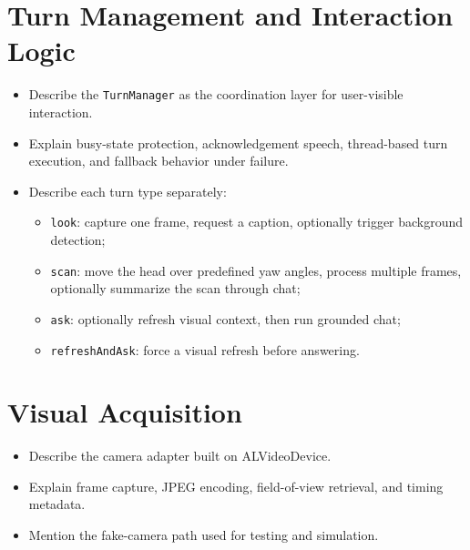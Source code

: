 \documentclass[
  digital,     %
  oneside,     %
  nosansbold,  %
  nocolorbold, %
  lof,         %
  lot,         %
]{fithesis4}
\begin{document}
\section{Turn Management and Interaction Logic}
\begin{itemize}
    \item Describe the \texttt{TurnManager} as the coordination layer for user-visible interaction.
    \item Explain busy-state protection, acknowledgement speech, thread-based turn execution, and fallback behavior under failure.
    \item Describe each turn type separately:
    \begin{itemize}
        \item \texttt{look}: capture one frame, request a caption, optionally trigger background detection;
        \item \texttt{scan}: move the head over predefined yaw angles, process multiple frames, optionally summarize the scan through chat;
        \item \texttt{ask}: optionally refresh visual context, then run grounded chat;
        \item \texttt{refreshAndAsk}: force a visual refresh before answering.
    \end{itemize}
\end{itemize}

\section{Visual Acquisition}
\begin{itemize}
    \item Describe the camera adapter built on ALVideoDevice.
    \item Explain frame capture, JPEG encoding, field-of-view retrieval, and timing metadata.
    \item Mention the fake-camera path used for testing and simulation.
\end{itemize}
\end{document}
